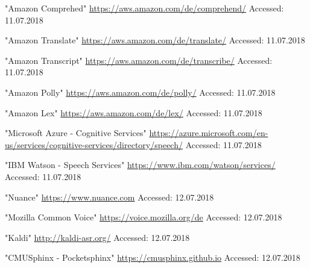 \documentclass[journal]{IEEEtran}
\begin{document}
\begin{thebibliography}{1}
"Amazon Comprehed"
\url{https://aws.amazon.com/de/comprehend/}
Accessed: 11.07.2018

"Amazon Translate"
\url{https://aws.amazon.com/de/translate/}
Accessed: 11.07.2018

"Amazon Transcript"
\url{https://aws.amazon.com/de/transcribe/}
Accessed: 11.07.2018

"Amazon Polly"
\url{https://aws.amazon.com/de/polly/}
Accessed: 11.07.2018

"Amazon Lex"
\url{https://aws.amazon.com/de/lex/}
Accessed: 11.07.2018

"Microsoft Azure - Cognitive Services"
\url{https://azure.microsoft.com/en-us/services/cognitive-services/directory/speech/}
Accessed: 11.07.2018

"IBM Watson - Speech Services"
\url{https://www.ibm.com/watson/services/}
Accessed: 11.07.2018

"Nuance"
\url{https://www.nuance.com}
Accessed: 12.07.2018

"Mozilla Common Voice"
\url{https://voice.mozilla.org/de}
Accessed: 12.07.2018

"Kaldi"
\url{http://kaldi-asr.org/}
Accessed: 12.07.2018

"CMUSphinx - Pocketsphinx"
\url{https://cmusphinx.github.io}
Accessed: 12.07.2018
\end{thebibliography}
\end{document}
